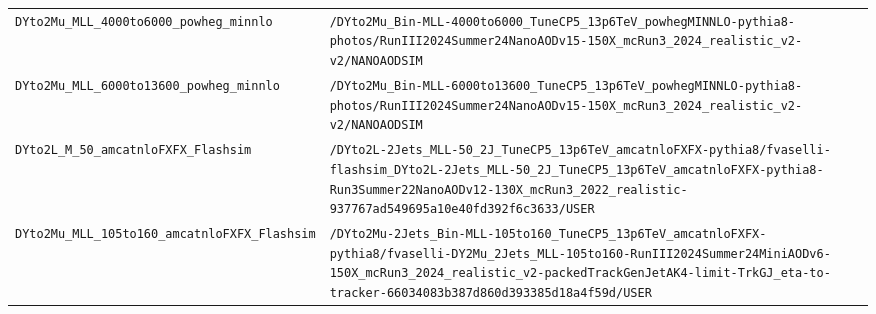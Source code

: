 \begin{longtable}{@{}>{\RaggedRight\arraybackslash}p{} >{\RaggedRight\arraybackslash}p{}@{}}
\addlinespace[2pt]
\texttt{DYto2Mu\_\allowbreak{}MLL\_\allowbreak{}4000to6000\_\allowbreak{}powheg\_\allowbreak{}minnlo} & \texttt{/\allowbreak{}DYto2Mu\_\allowbreak{}Bin-\allowbreak{}MLL-\allowbreak{}4000to6000\_\allowbreak{}TuneCP5\_\allowbreak{}13p6TeV\_\allowbreak{}powhegMINNLO-\allowbreak{}pythia8-\allowbreak{}photos/\allowbreak{}RunIII2024Summer24NanoAODv15-\allowbreak{}150X\_\allowbreak{}mcRun3\_\allowbreak{}2024\_\allowbreak{}realistic\_\allowbreak{}v2-\allowbreak{}v2/\allowbreak{}NANOAODSIM} \\
\addlinespace[2pt]
\texttt{DYto2Mu\_\allowbreak{}MLL\_\allowbreak{}6000to13600\_\allowbreak{}powheg\_\allowbreak{}minnlo} & \texttt{/\allowbreak{}DYto2Mu\_\allowbreak{}Bin-\allowbreak{}MLL-\allowbreak{}6000to13600\_\allowbreak{}TuneCP5\_\allowbreak{}13p6TeV\_\allowbreak{}powhegMINNLO-\allowbreak{}pythia8-\allowbreak{}photos/\allowbreak{}RunIII2024Summer24NanoAODv15-\allowbreak{}150X\_\allowbreak{}mcRun3\_\allowbreak{}2024\_\allowbreak{}realistic\_\allowbreak{}v2-\allowbreak{}v2/\allowbreak{}NANOAODSIM} \\
\addlinespace[2pt]
\texttt{DYto2L\_\allowbreak{}M\_\allowbreak{}50\_\allowbreak{}amcatnloFXFX\_\allowbreak{}Flashsim} & \texttt{/\allowbreak{}DYto2L-\allowbreak{}2Jets\_\allowbreak{}MLL-\allowbreak{}50\_\allowbreak{}2J\_\allowbreak{}TuneCP5\_\allowbreak{}13p6TeV\_\allowbreak{}amcatnloFXFX-\allowbreak{}pythia8/\allowbreak{}fvaselli-\allowbreak{}flashsim\_\allowbreak{}DYto2L-\allowbreak{}2Jets\_\allowbreak{}MLL-\allowbreak{}50\_\allowbreak{}2J\_\allowbreak{}TuneCP5\_\allowbreak{}13p6TeV\_\allowbreak{}amcatnloFXFX-\allowbreak{}pythia8-\allowbreak{}Run3Summer22NanoAODv12-\allowbreak{}130X\_\allowbreak{}mcRun3\_\allowbreak{}2022\_\allowbreak{}realistic-\allowbreak{}937767ad549695a10e40fd392f6c3633/\allowbreak{}USER} \\
\addlinespace[2pt]
\texttt{DYto2Mu\_\allowbreak{}MLL\_\allowbreak{}105to160\_\allowbreak{}amcatnloFXFX\_\allowbreak{}Flashsim} & \texttt{/\allowbreak{}DYto2Mu-\allowbreak{}2Jets\_\allowbreak{}Bin-\allowbreak{}MLL-\allowbreak{}105to160\_\allowbreak{}TuneCP5\_\allowbreak{}13p6TeV\_\allowbreak{}amcatnloFXFX-\allowbreak{}pythia8/\allowbreak{}fvaselli-\allowbreak{}DY2Mu\_\allowbreak{}2Jets\_\allowbreak{}MLL-\allowbreak{}105to160-\allowbreak{}RunIII2024Summer24MiniAODv6-\allowbreak{}150X\_\allowbreak{}mcRun3\_\allowbreak{}2024\_\allowbreak{}realistic\_\allowbreak{}v2-\allowbreak{}packedTrackGenJetAK4-\allowbreak{}limit-\allowbreak{}TrkGJ\_\allowbreak{}eta-\allowbreak{}to-\allowbreak{}tracker-\allowbreak{}66034083b387d860d393385d18a4f59d/\allowbreak{}USER} \\

\end{longtable}
